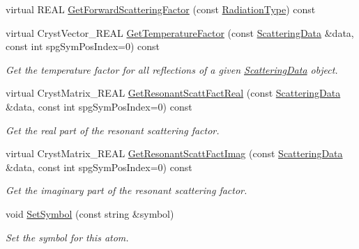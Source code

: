 \begin{DoxyCompactItemize}
virtual R\+E\+AL \mbox{\hyperlink{class_obj_cryst_1_1_scattering_power_atom_abe4d6e3b47759d143b5686abf490744f}{Get\+Forward\+Scattering\+Factor}} (const \mbox{\hyperlink{namespace_obj_cryst_a48fe50a094c607f8897378934d3d73ef}{Radiation\+Type}}) const
\item 
virtual Cryst\+Vector\+\_\+\+R\+E\+AL \mbox{\hyperlink{class_obj_cryst_1_1_scattering_power_atom_adc30331f57e8d79f362b4f2bccb9d4dd}{Get\+Temperature\+Factor}} (const \mbox{\hyperlink{class_obj_cryst_1_1_scattering_data}{Scattering\+Data}} \&data, const int spg\+Sym\+Pos\+Index=0) const
\begin{DoxyCompactList}\small\item\em Get the temperature factor for all reflections of a given \mbox{\hyperlink{class_obj_cryst_1_1_scattering_data}{Scattering\+Data}} object. \end{DoxyCompactList}\item 
virtual Cryst\+Matrix\+\_\+\+R\+E\+AL \mbox{\hyperlink{class_obj_cryst_1_1_scattering_power_atom_a38d48cd95ad51e9d83bfeb59988492c1}{Get\+Resonant\+Scatt\+Fact\+Real}} (const \mbox{\hyperlink{class_obj_cryst_1_1_scattering_data}{Scattering\+Data}} \&data, const int spg\+Sym\+Pos\+Index=0) const
\begin{DoxyCompactList}\small\item\em Get the real part of the resonant scattering factor. \end{DoxyCompactList}\item 
virtual Cryst\+Matrix\+\_\+\+R\+E\+AL \mbox{\hyperlink{class_obj_cryst_1_1_scattering_power_atom_a42db6378fdd8e3fbfae31b3f4dd5bb17}{Get\+Resonant\+Scatt\+Fact\+Imag}} (const \mbox{\hyperlink{class_obj_cryst_1_1_scattering_data}{Scattering\+Data}} \&data, const int spg\+Sym\+Pos\+Index=0) const
\begin{DoxyCompactList}\small\item\em Get the imaginary part of the resonant scattering factor. \end{DoxyCompactList}\item 
\mbox{\label{class_obj_cryst_1_1_scattering_power_atom_a549de97e18838d040c1aa473122f762e}} 
void \mbox{\hyperlink{class_obj_cryst_1_1_scattering_power_atom_a549de97e18838d040c1aa473122f762e}{Set\+Symbol}} (const string \&symbol)
\begin{DoxyCompactList}\small\item\em Set the symbol for this atom. \end{DoxyCompactList}\item 

\end{DoxyCompactItemize}
